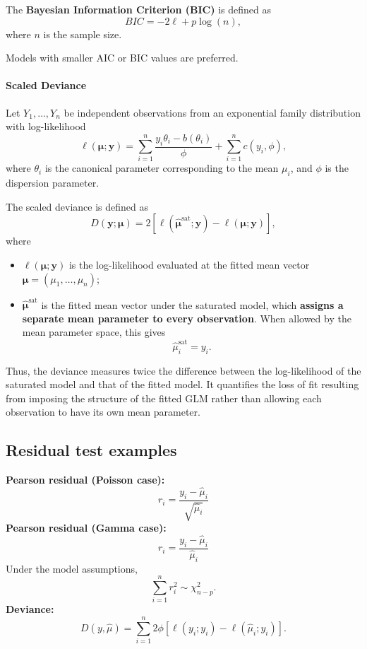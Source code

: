 \documentclass[11pt]{article}
\theoremstyle{definition}
\begin{document}
The \textbf{Bayesian Information Criterion (BIC)} is defined as
\[
BIC = -2\ell + p\log(n),
\]
where $n$ is the sample size.

Models with smaller AIC or BIC values are preferred.

\paragraph{Scaled Deviance}
Let \(Y_1,\dots,Y_n\) be independent observations from an exponential
family distribution with log-likelihood
\[
\ell(\boldsymbol{\mu};\mathbf{y})
=
\sum_{i=1}^n
\frac{y_i\theta_i-b(\theta_i)}{\phi}
+
\sum_{i=1}^n c(y_i,\phi),
\]
where \(\theta_i\) is the canonical parameter corresponding to the mean
\(\mu_i\), and \(\phi\) is the dispersion parameter.

The scaled deviance is defined as
\[
D(\mathbf{y};\boldsymbol{\mu})
=
2\left[
\ell(\widehat{\boldsymbol{\mu}}^{\mathrm{sat}};\mathbf{y})
-
\ell(\boldsymbol{\mu};\mathbf{y})
\right],
\]
where
\begin{itemize}
    \item \(\ell(\boldsymbol{\mu};\mathbf{y})\) is the log-likelihood
    evaluated at the fitted mean vector
    \(\boldsymbol{\mu}=(\mu_1,\dots,\mu_n)\);
    \item \(\widehat{\boldsymbol{\mu}}^{\mathrm{sat}}\) is the fitted mean
    vector under the saturated model, which \textbf{assigns a separate mean
    parameter to every observation}. When allowed by the mean parameter
    space, this gives
    \[
    \widehat{\mu}_i^{\mathrm{sat}}=y_i.
    \]
\end{itemize}

Thus, the deviance measures twice the difference between the log-likelihood
of the saturated model and that of the fitted model. It quantifies the loss
of fit resulting from imposing the structure of the fitted GLM rather than
allowing each observation to have its own mean parameter.

\subsection{Residual test examples}

\textbf{Pearson residual (Poisson case):}
\[
r_i =
\frac{y_i - \hat{\mu}_i}{\sqrt{\hat{\mu}_i}}
\]
\textbf{Pearson residual (Gamma case):}
\[
r_i =
\frac{y_i - \hat{\mu}_i}{\hat{\mu}_i}
\]
Under the model assumptions,
\[
\sum_{i=1}^n r_i^2 \sim \chi^2_{n-p}.
\]
\textbf{Deviance:}
\[
D(y,\hat{\mu}) =
\sum_{i=1}^n
2\phi
\left[
\ell(y_i;y_i) - \ell(\hat{\mu}_i;y_i)
\right].
\]
\end{document}
